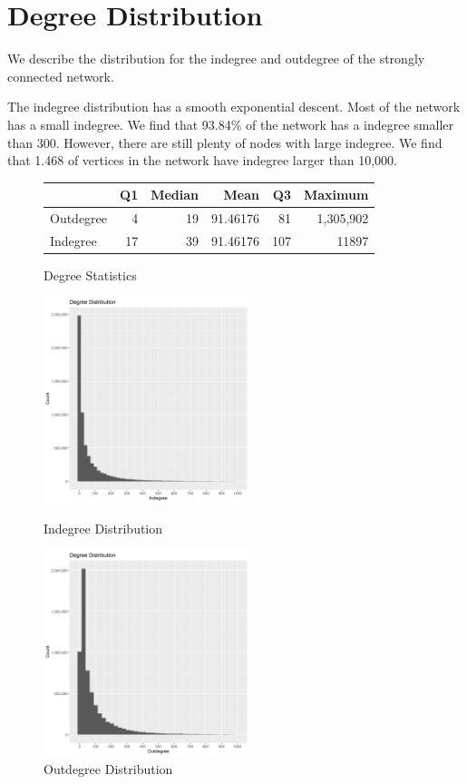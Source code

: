 \documentclass{article}
\begin{document}
\section{Degree Distribution}

We describe the distribution for the indegree and outdegree of the strongly connected network.


The indegree distribution has a smooth exponential descent. Most of the network has a small indegree. We find that 93.84\% of the network has a indegree smaller than 300. However, there are still plenty of nodes with large indegree. We find that 1.468 of vertices in the network have indegree larger than 10,000.



\begin{figure}[H]
    \centering
    \caption[]{Degree Statistics}
    \begin{tabular}{lrrrrr}
        \toprule
        & Q1 & Median & Mean & Q3 & Maximum\\
        \midrule
        Outdegree & 4 & 19 & 91.46176 & 81 & 1,305,902\\
        Indegree & 17 & 39 & 91.46176 & 107 & 11897\\
        \bottomrule
    \end{tabular}
\end{figure}

\begin{figure}[H]
    \centering
    \parbox{6cm}{
    \includegraphics[width=6cm]{in_degree_dist}
    \caption{Indegree Distribution}
    \label{fig:2figsA}}
    \qquad
    \begin{minipage}{6cm}
    \includegraphics[width=6cm]{out_degree_dist}
    \caption{Outdegree Distribution}
    \label{fig:2figsB}
    \end{minipage}
\end{figure}
\end{document}
